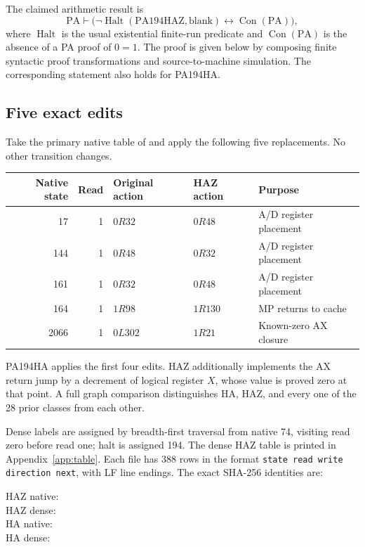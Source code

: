 \documentclass[11pt]{article}
\newcommand{\PA}{\mathrm{PA}}
\newcommand{\Con}{\operatorname{Con}}
\newcommand{\Halt}{\operatorname{Halt}}
\begin{document}
The claimed arithmetic result is
\[
 \PA\vdash\bigl(\neg\Halt(\mathrm{PA194HAZ},\text{blank})
                 \leftrightarrow\Con(\PA)\bigr),
\]
where $\Halt$ is the usual existential finite-run predicate and $\Con(\PA)$
is the absence of a PA proof of $0=1$. The proof is given below by composing
finite syntactic proof transformations and source-to-machine simulation.
The corresponding statement also holds for PA194HA.

\subsection{Five exact edits}

Take the primary native table of \cite{primary} and apply the following
five replacements. No other transition changes.
\begin{center}
\begin{tabular}{rrlll}
\toprule
Native state & Read & Original action & HAZ action & Purpose\\
\midrule
17   & 1 & $0R32$  & $0R48$  & A/D register placement\\
144  & 1 & $0R48$  & $0R32$  & A/D register placement\\
161  & 1 & $0R32$  & $0R48$  & A/D register placement\\
164  & 1 & $1R98$  & $1R130$ & MP returns to cache\\
2066 & 1 & $0L302$ & $1R21$  & Known-zero AX closure\\
\bottomrule
\end{tabular}
\end{center}
PA194HA applies the first four edits. HAZ additionally implements the AX
return jump by a decrement of logical register $X$, whose value is proved
zero at that point. A full graph comparison distinguishes HA, HAZ, and
every one of the 28 prior classes from each other.

Dense labels are assigned by breadth-first traversal from native 74,
visiting read zero before read one; halt is assigned 194. The dense HAZ
table is printed in Appendix~\ref{app:table}. Each file has 388 rows in the
format \texttt{state read write direction next}, with LF line endings.
The exact SHA-256 identities are:
\begin{description}
\item[HAZ native:] 
\item[HAZ dense:] 
\item[HA native:] 
\item[HA dense:] 
\end{description}
\end{document}
